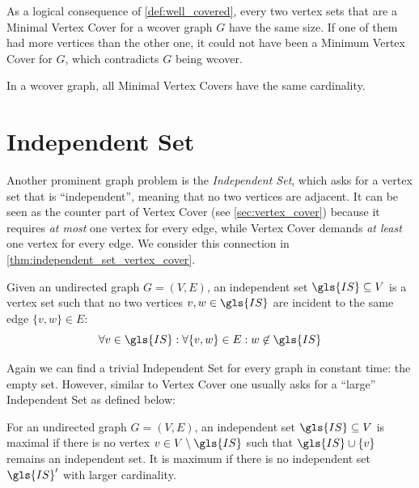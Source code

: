 As a logical consequence of \cref{def:well_covered}, every two vertex 
sets that are a Minimal Vertex Cover for a \gls{wcover} graph \(G\)
have the same size. If one of them had more vertices than the other
one, it could not have been a Minimum Vertex Cover for \(G\), which
contradicts \(G\) being \gls{wcover}.

\begin{theorem}
  \label{thm:well_covered_vertex_cover}
  In a \gls{wcover} graph, all Minimal Vertex Covers have the same
  cardinality. \cite{graph_well_covered}
\end{theorem}

\section{Independent Set}
\label{sec:independent_set}
Another prominent graph problem is the \emph{Independent Set}, which
asks for a vertex set that is ``independent'', meaning that no two
vertices are adjacent. It can be seen as the counter part of Vertex
Cover (see \cref{sec:vertex_cover}) because it requires \emph{at most}
one vertex for every edge, while Vertex Cover demands \emph{at least}
one vertex for every edge. We consider this connection in 
\cref{thm:independent_set_vertex_cover}.

\begin{definition}
  \label{def:independent_set}
  Given an undirected graph \(G=(V,E)\), an independent set
  \(\gls{IS} \subseteq V\) is a vertex set such that no two
  vertices \(v,w \in \gls{IS}\) are incident to the same edge 
  \(\{v,w\} \in E\):
  \[
    \forall v \in \gls{IS}:
    \forall \{v,w\} \in E:
    w \not\in \gls{IS}
  \]
\end{definition}

Again we can find a trivial Independent Set for every graph in
constant time: the empty set. However, similar to Vertex Cover one 
usually asks for a ``large'' Independent Set as defined below:

\begin{definition}
  \label{def:max_independent_set}
  For an undirected graph \(G=(V,E)\), an independent set
  \(\gls{IS}\subseteq V\) is maximal if there is no vertex
  \(v \in V\setminus \gls{IS}\) such that
  \(\gls{IS} \cup \{v\}\) remains an independent set. It is
  maximum if there is no independent set \(\gls{IS}'\) with
  larger cardinality.
\end{definition}

